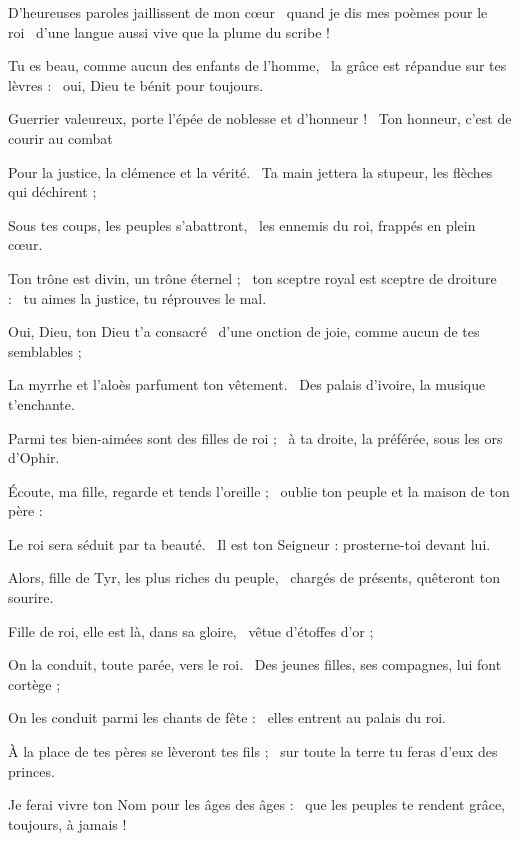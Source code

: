 \item D'heureuses paroles jaillissent de mon cœur~\pscross{} quand je dis mes poèmes pour le roi~\psstar{} d'une langue aussi vive que la plume du scribe !
\item Tu es beau, comme aucun des enfants de l'homme,~\pscross{} la grâce est répandue sur tes lèvres :~\psstar{} oui, Dieu te bénit pour toujours.
\item Guerrier valeureux, porte l'épée de noblesse et d'honneur !~\psstar{} Ton honneur, c'est de courir au combat 
\item Pour la justice, la clémence et la vérité.~\psstar{} Ta main jettera la stupeur, les flèches qui déchirent ; 
\item Sous tes coups, les peuples s'abattront,~\psstar{} les ennemis du roi, frappés en plein cœur.
\item Ton trône est divin, un trône éternel ;~\pscross{} ton sceptre royal est sceptre de droiture :~\psstar{} tu aimes la justice, tu réprouves le mal. 
\item Oui, Dieu, ton Dieu t'a consacré~\psstar{} d'une onction de joie, comme aucun de tes semblables ;
\item La myrrhe et l'aloès parfument ton vêtement.~\psstar{} Des palais d'ivoire, la musique t'enchante.
\item Parmi tes bien-aimées sont des filles de roi ;~\psstar{} à ta droite, la préférée, sous les ors d'Ophir.
\item Écoute, ma fille, regarde et tends l'oreille ;~\psstar{} oublie ton peuple et la maison de ton père :
\item Le roi sera séduit par ta beauté.~\psstar{} Il est ton Seigneur : prosterne-toi devant lui.
\item Alors, fille de Tyr, les plus riches du peuple,~\psstar{} chargés de présents, quêteront ton sourire.
\item Fille de roi, elle est là, dans sa gloire,~\psstar{} vêtue d'étoffes d'or ;
\item On la conduit, toute parée, vers le roi.~\psstar{} Des jeunes filles, ses compagnes, lui font cortège ;
\item On les conduit parmi les chants de fête :~\psstar{} elles entrent au palais du roi.
\item À la place de tes pères se lèveront tes fils ;~\psstar{} sur toute la terre tu feras d'eux des princes.
\item Je ferai vivre ton Nom pour les âges des âges :~\psstar{} que les peuples te rendent grâce, toujours, à jamais !
